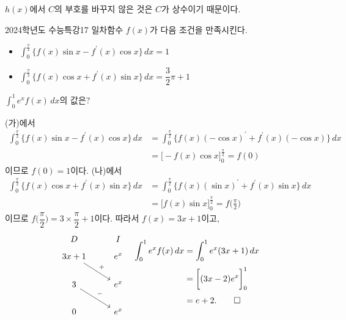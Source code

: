 \documentclass{article}
\begin{document}
\begin{remark}
	$h(x)$에서 $C$의 부호를 바꾸지 않은 것은 $C$가 상수이기 때문이다.
\end{remark}

\newpage
\begin{prob}{2024학년도 수능특강}{17}
	일차함수 $f(x)$가 다음 조건을 만족시킨다.
	\begin{hint}
		\begin{itemize}
			\item[(가)] $\displaystyle\int_0^{\tfrac{\pi}{2}}\{f(x)\sin x-f^{\prime}(x)\cos x\}\,dx=1$
			\item[(나)] $\displaystyle\int_0^{\tfrac{\pi}{2}}\{f(x)\cos x+f^{\prime}(x)\sin x\}\,dx=\dfrac{3}{2}\pi+1$
		\end{itemize}
	\end{hint}
	$\displaystyle\int_0^1e^xf(x)\,dx$의 값은?
\end{prob}

\begin{sol}
	(가)에서
	\[
		\begin{aligned}
			\int_0^{\tfrac{\pi}{2}}\{f(x)\sin x-f^{\prime}(x)\cos x\}\,dx&=\int_0^{\tfrac{\pi}{2}}\{f(x)(-\cos x)^{\prime}+f^{\prime}(x)(-\cos x)\}\,dx\\[3pt]
			&=\biggl[-f(x)\cos x\biggr]_0^{\tfrac{\pi}{2}}=f(0)
		\end{aligned}
	\]
	이므로 $f(0)=1$이다. (나)에서
	\[
		\begin{aligned}
			\int_0^{\tfrac{\pi}{2}}\{f(x)\cos x+f^{\prime}(x)\sin x\}\,dx&=\int_0^{\tfrac{\pi}{2}}\{f(x)(\sin x)^{\prime}+f^{\prime}(x)\sin x\}\,dx\\[3pt]
			&=\biggl[f(x)\sin x\biggr]_0^{\tfrac{\pi}{2}}=f\bigg(\frac{\pi}{2}\biggr)
		\end{aligned}
	\]
	이므로 $f\biggl(\dfrac{\pi}{2}\biggr)=3\times\dfrac{\pi}{2}+1$이다. 따라서 $f(x)=3x+1$이고,
	\[
		\begin{tikzcd}
			D & I \\[-12pt]
			3x+1 \arrow[rd, "+"] & e^x \\
			3 \arrow[rd, "-"] & e^x \\
			0 & e^x
		\end{tikzcd}\quad\begin{aligned}
			\int_0^1e^xf(x)\,dx&=\int_0^1e^x(3x+1)\,dx\\[3pt]
			&=\biggl[(3x-2)e^x\biggr]_0^1\\[3pt]
			&=e+2.\qed
		\end{aligned}
	\]
\end{sol}
\end{document}
